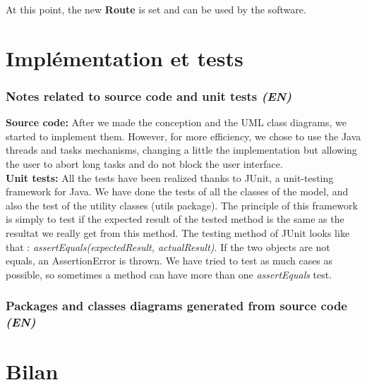 \documentclass[paper=a4,fontsize=11pt]{report}
\numberwithin{equation}{section}		%
\numberwithin{figure}{section}		%
\numberwithin{table}{section}		%
\renewcommand{\bf}[1]{\textbf{#1}}
\renewcommand{\it}[1]{\textit{#1}}
\begin{document}
At this point, the new \bf{Route} is set and can be used by the software.


\part{Implémentation et tests}
\label{part:implementation-et-tests}
\setcounter{section}{0}

\section{Notes related to source code and unit tests \it{(EN)}}
\label{sec:notes-related-to-source-code}

\bf{Source code:} After we made the conception and the UML class diagrams, we started to implement them. However, for more efficiency, we chose to use the Java threads and tasks mechanisms, changing a little the implementation but allowing the user to abort long tasks and do not block the user interface.\\

\bf{Unit tests:} All the tests have been realized thanks to JUnit, a unit-testing framework for Java. We have done the tests of all the classes of the model, and also the test of the utility classes (utils package). The principle of this framework is simply to test if the expected result of the tested method is the same as the resultat we really get from this method. The testing method of JUnit looks like that : \it{assertEquals(expectedResult, actualResult)}. If the two objects are not equals, an AssertionError is thrown. We have tried to test as much cases as possible, so sometimes a method can have more than one \it{assertEquals} test.
 
\section{Packages and classes diagrams generated from source code \it{(EN)}}
\label{sec:packages-and-classes-diagrams-generated-from-source-code}








\part{Bilan}
\label{part:bilan}
\setcounter{section}{0}
\end{document}
